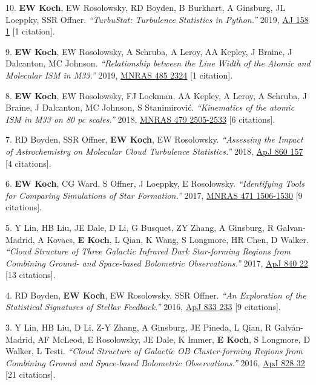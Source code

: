 \documentclass[letterpaper,11pt]{article}
\newenvironment{publist}{
  \begingroup
  \raggedright
  \begin{description}[leftmargin=4ex,style=sameline]
}{
  \end{description}
  \endgroup
}
\begin{document}
\begin{publist}
\item[10.] \textbf{EW Koch}, EW Rosolowsky, RD Boyden, B Burkhart, A Ginsburg, JL Loeppky, SSR Offner. \textit{``TurbuStat: Turbulence Statistics in Python.''} 2019, \href{http://adsabs.harvard.edu/abs/2019AJ....158....1K}{AJ 158 1} [1 citation].
\item[9.] \textbf{EW Koch}, EW Rosolowsky, A Schruba, A Leroy, AA Kepley, J Braine, J Dalcanton, MC Johnson. \textit{``Relationship between the Line Width of the Atomic and Molecular ISM in M33.''} 2019, \href{http://adsabs.harvard.edu/abs/2019MNRAS.485.2324K}{MNRAS 485 2324} [1 citation].
\item[8.] \textbf{EW Koch}, EW Rosolowsky, FJ Lockman, AA Kepley, A Leroy, A Schruba, J Braine, J Dalcanton, MC Johnson, S Stanimirovi\'{c}. \textit{``Kinematics of the atomic ISM in M33 on 80 pc scales.''} 2018, \href{http://adsabs.harvard.edu/abs/2018MNRAS.479.2505K}{MNRAS 479 2505-2533} [6 citations].
\item[7.] RD Boyden, SSR Offner, \textbf{EW Koch}, EW Rosolowsky. \textit{``Assessing the Impact of Astrochemistry on Molecular Cloud Turbulence Statistics.''} 2018, \href{http://adsabs.harvard.edu/abs/2018ApJ...860..157B}{ApJ 860 157} [4 citations].
\item[6.] \textbf{EW Koch}, CG Ward, S Offner, J Loeppky, E Rosolowsky. \textit{``Identifying Tools for Comparing Simulations of Star Formation.''} 2017, \href{http://adsabs.harvard.edu/abs/2017MNRAS.471.1506K}{MNRAS 471 1506-1530} [9 citations].
\item[5.] Y Lin, HB Liu, JE Dale, D Li, G Busquet, ZY Zhang, A Ginsburg, R Galvan-Madrid, A Kovacs, \textbf{E Koch}, L Qian, K Wang, S Longmore, HR Chen, D Walker. \textit{``Cloud Structure of Three Galactic Infrared Dark Star-forming Regions from Combining Ground- and Space-based Bolometric Observations.''} 2017, \href{http://adsabs.harvard.edu/abs/2017ApJ...840...22L}{ApJ 840 22} [13 citations].
\item[4.] RD Boyden, \textbf{EW Koch}, EW Rosolowsky, SSR Offner. \textit{``An Exploration of the Statistical Signatures of Stellar Feedback.''} 2016, \href{http://adsabs.harvard.edu/abs/2016ApJ...833..233B}{ApJ 833 233} [9 citations].
\item[3.] Y Lin, HB Liu, D Li, Z-Y Zhang, A Ginsburg, JE Pineda, L Qian, R Galv\'{a}n-Madrid, AF McLeod, E Rosolowsky, JE Dale, K Immer, \textbf{E Koch}, S Longmore, D Walker, L Testi. \textit{``Cloud Structure of Galactic OB Cluster-forming Regions from Combining Ground and Space-based Bolometric Observations.''} 2016, \href{http://adsabs.harvard.edu/abs/2016ApJ...828...32L}{ApJ 828 32} [21 citations].

\end{publist}
\end{document}
